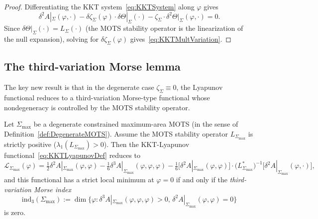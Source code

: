 \begin{proof}
Differentiating the KKT system~\eqref{eq:KKTSystem} along $\varphi$ gives
\[
    \delta^2 A|_\Sigma(\varphi,\cdot)-\delta\zeta_\Sigma(\varphi)\cdot\delta\Theta|_\Sigma(\cdot)-\zeta_\Sigma\cdot\delta^2\Theta|_\Sigma(\varphi,\cdot)=0.
\]
Since $\delta\Theta|_\Sigma(\cdot)=L_\Sigma(\cdot)$ (the MOTS stability operator is the linearization of the null expansion), solving for $\delta\zeta_\Sigma(\varphi)$ gives~\eqref{eq:KKTMultVariation}.
\end{proof}

\subsection{The third-variation Morse lemma}

The key new result is that in the degenerate case $\zeta_\Sigma\equiv 0$, the Lyapunov functional reduces to a third-variation Morse-type functional whose nondegeneracy is controlled by the MOTS stability operator.

\begin{theorem}\label{thm:ThirdVariationMorse}
Let $\Sigma_{\max}$ be a degenerate constrained maximum-area MOTS (in the sense of Definition~\ref{def:DegenerateMOTS}). Assume the MOTS stability operator $L_{\Sigma_{\max}}$ is strictly positive ($\lambda_1(L_{\Sigma_{\max}})>0$). Then the KKT-Lyapunov functional~\eqref{eq:KKTLyapunovDef} reduces to
\begin{equation}\label{eq:LyapunovDegenerate}
    \mathcal L_{\Sigma_{\max}}(\varphi)
    =
    \tfrac12\delta^2 A|_{\Sigma_{\max}}(\varphi,\varphi)
    -\tfrac{1}{6}\delta^3 A|_{\Sigma_{\max}}(\varphi,\varphi,\varphi)
    -\tfrac{1}{6}\bigl[\delta^2 A|_{\Sigma_{\max}}(\varphi,\varphi)\bigr]\cdot\bigl(L_{\Sigma_{\max}}^*\bigr)^{-1}\bigl[\delta^2 A|_{\Sigma_{\max}}(\varphi,\cdot)\bigr],
\end{equation}
and this functional has a strict local minimum at $\varphi=0$ if and only if the \emph{third-variation Morse index}
\begin{equation}\label{eq:ThirdVariationMorseIndex}
    \mathrm{ind}_3(\Sigma_{\max})
    :=
    \dim\bigl\{\varphi:\delta^3 A|_{\Sigma_{\max}}(\varphi,\varphi,\varphi)>0,\,\delta^2 A|_{\Sigma_{\max}}(\varphi,\varphi)=0\bigr\}
\end{equation}
is zero.
\end{theorem}

